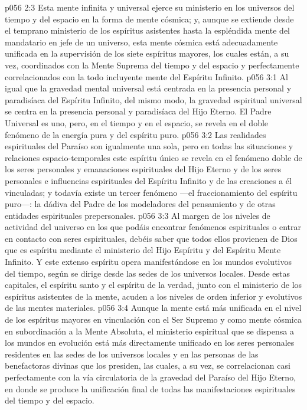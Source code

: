 \vs p056 2:3 Esta mente infinita y universal ejerce su ministerio en los universos del tiempo y del espacio en la forma de mente cósmica; y, aunque se extiende desde el temprano ministerio de los espíritus asistentes hasta la espléndida mente del mandatario en jefe de un universo, esta mente cósmica está adecuadamente unificada en la supervisión de los siete espíritus mayores, los cuales están, a su vez, coordinados con la Mente Suprema del tiempo y del espacio y perfectamente correlacionados con la todo incluyente mente del Espíritu Infinito.
\vs p056 3:1 Al igual que la gravedad mental universal está centrada en la presencia personal y paradisíaca del Espíritu Infinito, del mismo modo, la gravedad espiritual universal se centra en la presencia personal y paradisíaca del Hijo Eterno. El Padre Universal es uno, pero, en el tiempo y en el espacio, se revela en el doble fenómeno de la energía pura y del espíritu puro.
\vs p056 3:2 Las realidades espirituales del Paraíso son igualmente una sola, pero en todas las situaciones y relaciones espacio\hyp{}temporales este espíritu único se revela en el fenómeno doble de los seres personales y emanaciones espirituales del Hijo Eterno y de los seres personales e influencias espirituales del Espíritu Infinito y de las creaciones a él vinculadas; y todavía existe un tercer fenómeno ---el fraccionamiento del espíritu puro---: la dádiva del Padre de los modeladores del pensamiento y de otras entidades espirituales prepersonales.
\vs p056 3:3 \pc Al margen de los niveles de actividad del universo en los que podáis encontrar fenómenos espirituales o entrar en contacto con seres espirituales, debéis saber que todos ellos provienen de Dios que es espíritu mediante el ministerio del Hijo Espíritu y del Espíritu Mente Infinito. Y este extenso espíritu opera manifestándose en los mundos evolutivos del tiempo, según se dirige desde las sedes de los universos locales. Desde estas capitales, el espíritu santo y el espíritu de la verdad, junto con el ministerio de los espíritus asistentes de la mente, acuden a los niveles de orden inferior y evolutivos de las mentes materiales.
\vs p056 3:4 Aunque la mente está más unificada en el nivel de los espíritus mayores en vinculación con el Ser Supremo y como mente cósmica en subordinación a la Mente Absoluta, el ministerio espiritual que se dispensa a los mundos en evolución está más directamente unificado en los seres personales residentes en las sedes de los universos locales y en las personas de las benefactoras divinas que los presiden, las cuales, a su vez, se correlacionan casi perfectamente con la vía circulatoria de la gravedad del Paraíso del Hijo Eterno, en donde se produce la unificación final de todas las manifestaciones espirituales del tiempo y del espacio.

